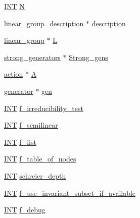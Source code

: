 \begin{DoxyCompactItemize}
\item 
\mbox{\hyperlink{galois_8h_a09fddde158a3a20bd2dcadb609de11dc}{I\+NT}} \mbox{\hyperlink{classcode__generator_ace193519a1a5eab37c6fafd4b612bdb0}{N}}
\item 
\mbox{\hyperlink{classlinear__group__description}{linear\+\_\+group\+\_\+description}} $\ast$ \mbox{\hyperlink{classcode__generator_a5338a11e26e4149962baaac7a25054b6}{description}}
\item 
\mbox{\hyperlink{classlinear__group}{linear\+\_\+group}} $\ast$ \mbox{\hyperlink{classcode__generator_aabba39550c29e03fec2a3984aa4bc41d}{L}}
\item 
\mbox{\hyperlink{classstrong__generators}{strong\+\_\+generators}} $\ast$ \mbox{\hyperlink{classcode__generator_a32849f7e089db573773a78a39c33b471}{Strong\+\_\+gens}}
\item 
\mbox{\hyperlink{classaction}{action}} $\ast$ \mbox{\hyperlink{classcode__generator_afd1519b373d544c57251154f85c8f403}{A}}
\item 
\mbox{\hyperlink{classgenerator}{generator}} $\ast$ \mbox{\hyperlink{classcode__generator_ab95055151d199988c5cae2e7fe03068e}{gen}}
\item 
\mbox{\hyperlink{galois_8h_a09fddde158a3a20bd2dcadb609de11dc}{I\+NT}} \mbox{\hyperlink{classcode__generator_ae38cd34bf355cb62bf375b84e276e4ea}{f\+\_\+irreducibility\+\_\+test}}
\item 
\mbox{\hyperlink{galois_8h_a09fddde158a3a20bd2dcadb609de11dc}{I\+NT}} \mbox{\hyperlink{classcode__generator_ac5f1d5ee6af57541eb59bd6f1b1fb1e1}{f\+\_\+semilinear}}
\item 
\mbox{\hyperlink{galois_8h_a09fddde158a3a20bd2dcadb609de11dc}{I\+NT}} \mbox{\hyperlink{classcode__generator_aa1a99db5292ab6a01439adeb0116f07c}{f\+\_\+list}}
\item 
\mbox{\hyperlink{galois_8h_a09fddde158a3a20bd2dcadb609de11dc}{I\+NT}} \mbox{\hyperlink{classcode__generator_addfae8615e9f030fd9bb6fdab03197d0}{f\+\_\+table\+\_\+of\+\_\+nodes}}
\item 
\mbox{\hyperlink{galois_8h_a09fddde158a3a20bd2dcadb609de11dc}{I\+NT}} \mbox{\hyperlink{classcode__generator_a6b9b2c590f8080a428b85628dd03c611}{schreier\+\_\+depth}}
\item 
\mbox{\hyperlink{galois_8h_a09fddde158a3a20bd2dcadb609de11dc}{I\+NT}} \mbox{\hyperlink{classcode__generator_a3994d579ce34eb93fc8b74b29914f746}{f\+\_\+use\+\_\+invariant\+\_\+subset\+\_\+if\+\_\+available}}
\item 
\mbox{\hyperlink{galois_8h_a09fddde158a3a20bd2dcadb609de11dc}{I\+NT}} \mbox{\hyperlink{classcode__generator_ab2d6e892269b9ae08a38b001c9556c83}{f\+\_\+debug}}

\end{DoxyCompactItemize}
